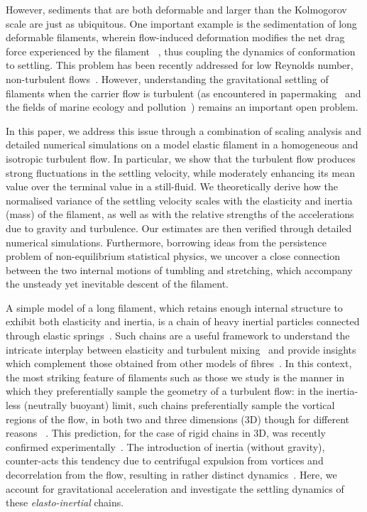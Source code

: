 \documentclass[aps,prl,twocolumn,superscriptaddress,floatfix,tightenlines,showpacs,notitlepage]{revtex4-1}
\begin{document}
However, sediments that are both deformable and larger than the Kolmogorov
scale are just as ubiquitous. One important example is the sedimentation of
long deformable filaments, wherein flow-induced deformation modifies the net
drag force experienced by the filament ~\cite{Shelley}, thus coupling the
dynamics of conformation to settling.  This problem has been recently addressed
for low Reynolds number, non-turbulent flows~\cite{Marchetti}. However,
understanding the gravitational settling of filaments when the carrier flow is
turbulent (as encountered in papermaking~\citep{Lundell2011}
 and the fields of marine ecology
and pollution~\cite{Barnes,Lusher2015,Stelfox2016,Lebreton2018})
remains an important open problem.

In this paper, we address this issue through a combination of scaling analysis and
detailed numerical simulations on a model elastic filament in a homogeneous 
and isotropic turbulent flow. In particular, we show that the turbulent flow produces strong fluctuations in the settling velocity, while moderately enhancing its mean value over the terminal value in a still-fluid. We theoretically derive how the normalised variance
of the settling velocity scales with the
elasticity and inertia (mass) of the filament, as well as with the relative strengths of the accelerations due to gravity and turbulence. Our estimates are then verified
through detailed numerical simulations. Furthermore, borrowing ideas from 
the persistence problem of non-equilibrium statistical physics, 
we uncover a close connection between the two internal motions 
of tumbling and stretching, which accompany the unsteady yet inevitable
descent of the filament.

A simple model of a long filament, which retains enough internal structure to
exhibit both elasticity and inertia, is a chain of heavy inertial particles
connected through elastic springs~\cite{Bird}. Such chains are a useful
framework to understand the intricate interplay between elasticity and
turbulent mixing~\cite{PicardoPRL,Singh2020,RoyalChains} and provide insights which complement 
those obtained from other models of fibres~\cite{Brouzet_polymer,Verhille_3dconf_fiber,Brandt_fiber,Bec_Chain}.  In this context, the
most striking feature of filaments such as those we study is the manner in which they preferentially
sample the geometry of a turbulent flow: in the inertia-less (neutrally
buoyant) limit, such chains preferentially sample the vortical regions of the
flow, in both two and three dimensions (3D) though for different reasons
~\cite{PicardoPRL,RoyalChains}. This prediction, for the case of rigid chains
in 3D, was recently confirmed experimentally~\citep{Oehmke2020}. The
introduction of inertia (without gravity), counter-acts this tendency due to
centrifugal expulsion from vortices and decorrelation from the flow, resulting
in rather distinct dynamics~\cite{Singh2020}.  Here, we account for
gravitational acceleration and investigate the settling dynamics of these
\textit{elasto-inertial} chains.
\end{document}
